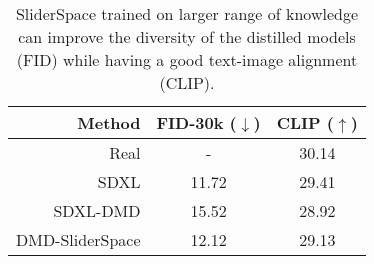 \begin{table}
    \centering
    \begin{tabular}{rcc}
        \textbf{Method} & \textbf{FID-30k ($\downarrow$)} & \textbf{CLIP ($\uparrow$)} \\
        \hline
        Real & - & 30.14 \\
        SDXL &  11.72 & 29.41 \\
        SDXL-DMD &  15.52 & 28.92 \\
        DMD-SliderSpace & 12.12 & 29.13 \\

    \end{tabular}
    \caption{SliderSpace trained on larger range of knowledge can improve the diversity of the distilled models (FID) while having a good text-image alignment (CLIP).}
    \label{tab:diverse}
\end{table}
